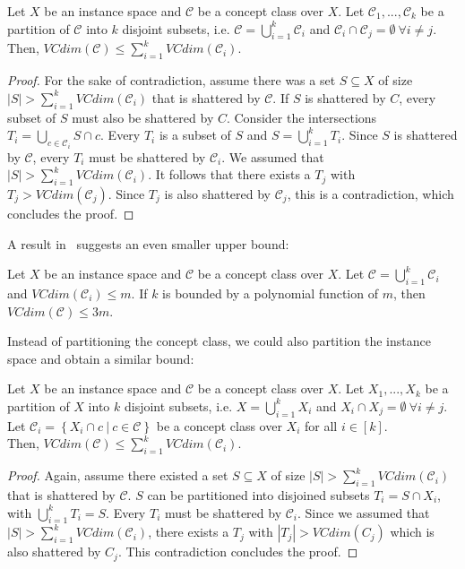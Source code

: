 \begin{lemma}
    Let $X$ be an instance space and $\mathcal{C}$ be a concept class
    over $X$.
    Let $\mathcal{C}_1, ..., \mathcal{C}_k$ be a partition of $\mathcal{C}$
    into $k$ disjoint subsets, i.e.
    $\mathcal{C} = \bigcup_{i=1}^k \mathcal{C}_i$ and
    $\mathcal{C}_i \cap \mathcal{C}_j = \emptyset\ \forall i \neq j$.
    Then, $VCdim(\mathcal{C}) \leq \sum_{i=1}^k VCdim(\mathcal{C}_i)$.
\end{lemma}
\begin{proof}
    For the sake of contradiction, assume there was a set $S \subseteq X$
    of size $|S| > \sum_{i=1}^k VCdim(\mathcal{C}_i)$ that is shattered by
    $\mathcal{C}$. If $S$ is shattered by $C$, every subset of $S$ must also
    be shattered by $C$.
    Consider the intersections $T_i = \bigcup_{c \in \mathcal{C}_i} S \cap c$.
    Every $T_i$
    is a subset of $S$ and $S = \bigcup_{i=1}^k T_i$.
    Since $S$ is shattered by $\mathcal{C}$,
    every $T_i$ must be shattered by $\mathcal{C}_i$.
    We assumed that $|S| > \sum_{i=1}^k VCdim(\mathcal{C}_i)$.
    It follows that there exists a $T_j$ with $T_j > VCdim(\mathcal{C}_j)$.
    Since $T_j$ is also shattered by $\mathcal{C}_j$, this is a contradiction,
    which concludes the proof.
\end{proof}

A result in~\cite{vc-dimension-partition} suggests an even smaller upper bound:
\begin{lemma}
    Let $X$ be an instance space and $\mathcal{C}$ be a
    concept class over $X$.
    Let $\mathcal{C} = \bigcup_{i=1}^k \mathcal{C}_i$
    and $VCdim(\mathcal{C}_i) \leq m$.
    If $k$ is bounded by a polynomial function of $m$,
    then $VCdim(\mathcal{C}) \leq 3m$.
\end{lemma}

Instead of partitioning the concept class, we could also partition the
instance space and obtain a similar bound:

\begin{lemma}
    \label{lemma:instance-space-partition}
    Let $X$ be an instance space and $\mathcal{C}$ be a concept class
    over $X$.
    Let $X_1, ..., X_k$ be a partition of $X$ into $k$ disjoint subsets, i.e.
    $X = \bigcup_{i=1}^{k} X_i$ and
    $X_i \cap X_j = \emptyset\ \forall i \neq j$.
    Let $\mathcal{C}_i = \left\{ X_i \cap c\ |\ c \in \mathcal{C} \right\}$
    be a concept class over $X_i$ for all $i \in [k]$.\\
    Then, $VCdim(\mathcal{C}) \leq \sum_{i=1}^k VCdim(\mathcal{C}_i)$.
\end{lemma}
\begin{proof}
    Again, assume there existed a set $S \subseteq X$ of size
    $|S| > \sum_{i=1}^k VCdim(\mathcal{C}_i)$ that is shattered
    by $\mathcal{C}$.
    $S$ can be partitioned into disjoined subsets $T_i = S \cap X_i$, with
    $\bigcup_{i=1}^k T_i = S$.
    Every $T_i$ must be shattered by $\mathcal{C}_i$.
    Since we assumed that $|S| > \sum_{i=1}^k VCdim(\mathcal{C}_i)$,
    there exists a $T_j$ with $|T_j| > VCdim(C_j)$ which is also
    shattered by $C_j$. This contradiction concludes the proof.
\end{proof}

